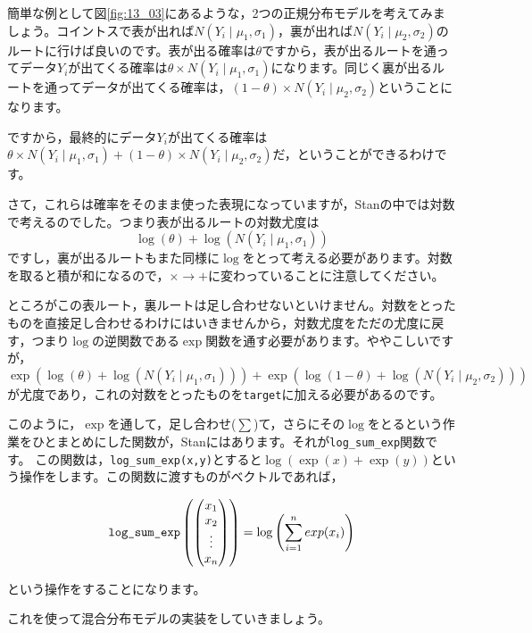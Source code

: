 \documentclass{ltjsbook}
\begin{document}
簡単な例として図\ref{fig:13_03}にあるような，2つの正規分布モデルを考えてみましょう。コイントスで表が出れば$N(Y_i \mid \mu_1,\sigma_1)$，裏が出れば$N(Y_i \mid \mu_2,\sigma_2)$のルートに行けば良いのです。表が出る確率は$\theta$ですから，表が出るルートを通ってデータ$Y_i$が出てくる確率は$\theta \times N(Y_i \mid \mu_1,\sigma_1)$になります。同じく裏が出るルートを通ってデータが出てくる確率は，$(1-\theta) \times N(Y_i \mid \mu_2,\sigma_2)$ということになります。

ですから，最終的にデータ$Y_i$が出てくる確率は$\theta \times N(Y_i \mid \mu_1,\sigma_1) + (1-\theta) \times N(Y_i\mid\mu_2,\sigma_2)$だ，ということができるわけです。

さて，これらは確率をそのまま使った表現になっていますが，Stanの中では対数で考えるのでした。つまり表が出るルートの対数尤度は
\[ \log(\theta) + \log(N(Y_i\mid\mu_1,\sigma_1)) \]
ですし，裏が出るルートもまた同様に$\log$をとって考える必要があります。対数を取ると積が和になるので，$\times \to +$に変わっていることに注意してください。

ところがこの表ルート，裏ルートは足し合わせないといけません。対数をとったものを直接足し合わせるわけにはいきませんから，対数尤度をただの尤度に戻す，つまり$\log$の逆関数である$\exp$関数を通す必要があります。ややこしいですが，
\[ \exp\left( \log(\theta) + \log(N(Y_i\mid\mu_1,\sigma_1)) \right) + \exp\left( \log(1-\theta) + \log(N(Y_i\mid\mu_2,\sigma_2)) \right) \]
が尤度であり，これの対数をとったものを\verb|target|に加える必要があるのです。

このように，$\exp$を通して，足し合わせ($\sum$)て，さらにその$\log$をとるという作業をひとまとめにした関数が，Stanにはあります。それが\verb|log_sum_exp|関数です。
この関数は，\verb|log_sum_exp(x,y)|とすると$\log(\exp(x)+\exp(y))$という操作をします。この関数に渡すものがベクトルであれば，

\[ \verb|log_sum_exp|\left( \begin{pmatrix} x_1\\x_2\\ \vdots \\ x_n \end{pmatrix} \right) = \log\left(\sum_{i=1}^n exp(x_i) \right) \]

という操作をすることになります。

これを使って混合分布モデルの実装をしていきましょう。
\end{document}
